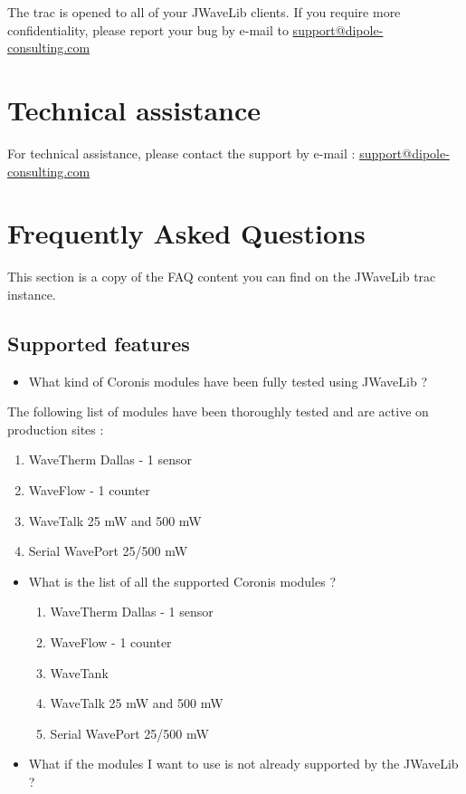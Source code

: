 \documentclass[a4paper,10pt,english]{sphinxmanual}
\begin{document}
The trac is opened to all of your JWaveLib clients. If you require more
confidentiality, please report your bug by e-mail to
\href{mailto:support@dipole-consulting.com}{support@dipole-consulting.com}


\section{Technical assistance}
\label{support:technical-assistance}
For technical assistance, please contact the support by e-mail :
\href{mailto:support@dipole-consulting.com}{support@dipole-consulting.com}


\section{Frequently Asked Questions}
\label{support:frequently-asked-questions}
This section is a copy of the FAQ content you can find on the JWaveLib trac
instance.


\subsection{Supported features}
\label{support:supported-features}\begin{itemize}
\item {} 
What kind of Coronis modules have been fully tested using JWaveLib ?

\end{itemize}

The following list of modules have been thoroughly tested and are active on production sites :
\begin{enumerate}
\item {} 
WaveTherm Dallas - 1 sensor

\item {} 
WaveFlow - 1 counter

\item {} 
WaveTalk 25 mW and 500 mW

\item {} 
Serial WavePort 25/500 mW

\end{enumerate}
\begin{itemize}
\item {} 
What is the list of all the supported Coronis modules ?
\begin{enumerate}
\item {} 
WaveTherm Dallas - 1 sensor

\item {} 
WaveFlow - 1 counter

\item {} 
WaveTank

\item {} 
WaveTalk 25 mW and 500 mW

\item {} 
Serial WavePort 25/500 mW

\end{enumerate}

\item {} 
What if the modules I want to use is not already supported by the JWaveLib ?

\end{itemize}
\end{document}
